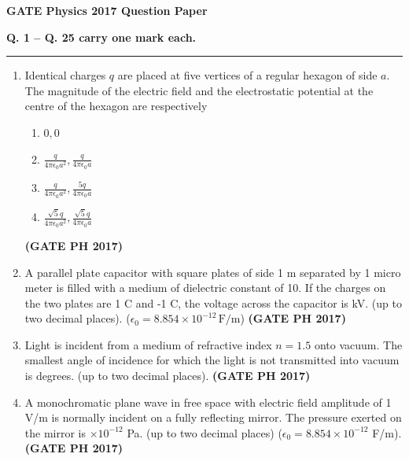 \documentclass[14pt, a4paper]{extarticle}
\begin{document}
\begin{center}
    \Large\textbf{GATE Physics 2017 Question Paper}
\end{center}

\noindent\textbf{Q. 1 – Q. 25 carry one mark each.}
\hrule

\begin{enumerate}[label=\textbf{Q.\arabic*}]

\item Identical charges $q$ are placed at five vertices of a regular hexagon of side $a$. The magnitude of the electric field and the electrostatic potential at the centre of the hexagon are respectively
    \begin{enumerate}
        \item $0, 0$
        \item $\frac{q}{4\pi\epsilon_0 a^2}, \frac{q}{4\pi\epsilon_0 a}$
        \item $\frac{q}{4\pi\epsilon_0 a^2}, \frac{5q}{4\pi\epsilon_0 a}$
        \item $\frac{\sqrt{5}q}{4\pi\epsilon_0 a^2}, \frac{\sqrt{5}q}{4\pi\epsilon_0 a}$
    \end{enumerate}
    \hfill \textbf{(GATE PH 2017)}
    
    \item A parallel plate capacitor with square plates of side 1 m separated by 1 micro meter is filled with a medium of dielectric constant of 10. If the charges on the two plates are 1 C and -1 C, the voltage across the capacitor is \underline{\hspace{5em}} kV. (up to two decimal places). ($\epsilon_0 = 8.854 \times 10^{-12}\,\text{F/m}$)
    \hfill \textbf{(GATE PH 2017)}

\item Light is incident from a medium of refractive index $n=1.5$ onto vacuum. The smallest angle of incidence for which the light is not transmitted into vacuum is \underline{\hspace{3cm}} degrees. (up to two decimal places).
\hfill \textbf{(GATE PH 2017)}

\item A monochromatic plane wave in free space with electric field amplitude of 1 V/m is normally incident on a fully reflecting mirror. The pressure exerted on the mirror is \underline{\hspace{3cm}} $\times 10^{-12}$ Pa. (up to two decimal places) ($\epsilon_0 = 8.854 \times 10^{-12}$ F/m).
\hfill \textbf{(GATE PH 2017)}


\end{enumerate}
\end{document}
